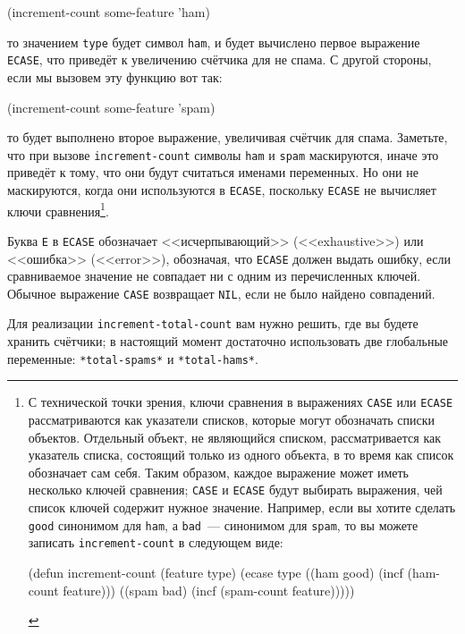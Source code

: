 \begin{myverb}
(increment-count some-feature 'ham)
\end{myverb}

\noindent{}то значением \lstinline{type} будет символ \lstinline{ham}, и будет вычислено первое выражение
\lstinline{ECASE}, что приведёт к увеличению счётчика для не спама. С другой стороны, если мы
вызовем эту функцию вот так:

\begin{myverb}
(increment-count some-feature 'spam)
\end{myverb}

\noindent{}то будет выполнено второе выражение, увеличивая счётчик для спама.  Заметьте, что при
вызове \lstinline{increment-count} символы \lstinline{ham} и \lstinline{spam} маскируются, иначе это
приведёт к тому, что они будут считаться именами переменных.  Но они не маскируются, когда
они используются в \lstinline{ECASE}, поскольку \lstinline{ECASE} не вычисляет ключи
сравнения\footnote{С технической точки зрения, ключи сравнения в выражениях \lstinline{CASE}
  или \lstinline{ECASE} рассматриваются как указатели списков, которые могут обозначать списки
  объектов.  Отдельный объект, не являющийся списком, рассматривается как указатель
  списка, состоящий только из одного объекта, в то время как список обозначает сам себя.
  Таким образом, каждое выражение может иметь несколько ключей сравнения; \lstinline{CASE} и
  \lstinline{ECASE} будут выбирать выражения, чей список ключей содержит нужное значение.
  Например, если вы хотите сделать \lstinline{good} синонимом для \lstinline{ham}, а \lstinline{bad}~---
  синонимом для \lstinline{spam}, то вы можете записать \lstinline{increment-count} в следующем
  виде:

\begin{myverb}
(defun increment-count (feature type)
  (ecase type
    ((ham good) (incf (ham-count feature)))
    ((spam bad) (incf (spam-count feature)))))
\end{myverb}
}.

Буква \lstinline{E} в \lstinline{ECASE} обозначает <<исчерпывающий>> (<<exhaustive>>) или
<<ошибка>> (<<error>>), обозначая, что \lstinline{ECASE} должен выдать ошибку, если сравниваемое
значение не совпадает ни с одним из перечисленных ключей.  Обычное выражение \lstinline{CASE}
возвращает \lstinline{NIL}, если не было найдено совпадений.

Для реализации \lstinline{increment-total-count} вам нужно решить, где вы будете хранить
счётчики; в настоящий момент достаточно использовать две глобальные переменные:
\lstinline{*total-spams*} и \lstinline{*total-hams*}.

